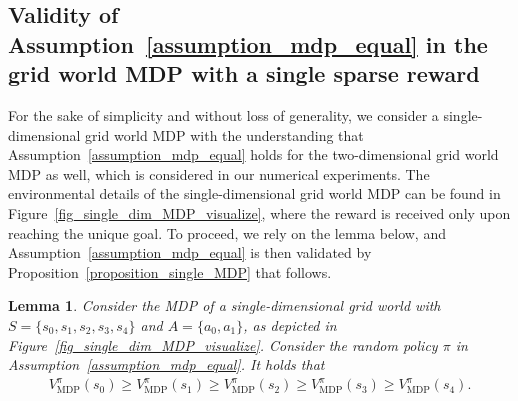 \documentclass[10pt]{article}
\newtheorem{lemma}{Lemma}
\begin{document}
\subsection{Validity of Assumption~\ref{assumption_mdp_equal} in the grid world MDP with a single sparse reward}
\label{appendix_validate_assump2}
For the sake of simplicity and without loss of generality, we consider a single-dimensional grid world MDP with the understanding that Assumption~\ref{assumption_mdp_equal} holds for the two-dimensional grid world MDP as well, which is considered in our numerical experiments. The environmental details of the single-dimensional grid world MDP can be found in Figure~\ref{fig_single_dim_MDP_visualize}, where the reward is received only upon reaching the unique goal.
To proceed, we rely on the lemma below, and Assumption~\ref{assumption_mdp_equal} is then validated by Proposition~\ref{proposition_single_MDP} that follows.
\begin{lemma}\label{lemma_v_monotonic}
    Consider the MDP of a single-dimensional grid world with $S=\{s_0, s_1, s_2, s_3, s_4\}$ and $A=\{a_0, a_1\}$, as depicted in Figure~\ref{fig_single_dim_MDP_visualize}. Consider the random policy $\pi$ in Assumption~\ref{assumption_mdp_equal}. It holds that
    \begin{align}
        V_\text{MDP}^{\pi}(s_0) \geq V_\text{MDP}^{\pi}(s_1) \geq V_\text{MDP}^{\pi}(s_2) \geq V_\text{MDP}^{\pi}(s_3) \geq V_\text{MDP}^{\pi}(s_4).
    \end{align}
\end{lemma}
\end{document}
